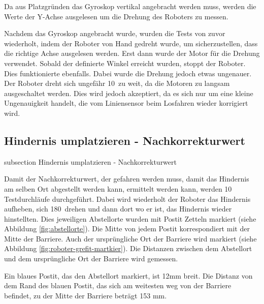 Da aus Platzgründen das Gyroskop vertikal angebracht werden muss, werden die Werte der Y-Achse ausgelesen um die Drehung des Roboters zu messen.

Nachdem das Gyroskop angebracht wurde, wurden die Tests von zuvor wiederholt, indem der Roboter von Hand gedreht wurde, um sicherzustellen, dass die richtige Achse ausgelesen werden. Erst dann wurde der Motor für die Drehung verwendet. Sobald der definierte Winkel erreicht wurden, stoppt der Roboter. Dies funktionierte ebenfalls. Dabei wurde die Drehung jedoch etwas ungenauer. Der Roboter dreht sich ungefähr 10\textdegree \ zu weit, da die Motoren zu langsam ausgeschaltet werden. Dies wird jedoch akzeptiert, da es sich nur um eine kleine Ungenauigkeit handelt, die vom Liniensensor beim Losfahren wieder korrigiert wird.


\newpage
\subsection*{Hindernis umplatzieren - Nachkorrekturwert}\label{hindernis-nachkorrektur}
    {subsection}
    {Hindernis umplatzieren - Nachkorrekturwert}

Damit der Nachkorrekturwert, der gefahren werden muss, damit das Hindernis am selben Ort abgestellt werden kann, ermittelt werden kann, werden 10 Testdurchläufe durchgeführt. Dabei wird wiederholt der Roboter das Hindernis aufheben, sich 180\textdegree \ drehen und dann dort wo er ist, das Hindernis wieder hinstellten. Dies jeweiligen Abstellorte wurden mit Postit Zetteln markiert (siehe Abbildung \ref{fig:abstellorte}). Die Mitte von jedem Postit korrespondiert mit der Mitte der Barriere. Auch der ursprüngliche Ort der Barriere wird markiert (siehe Abbildung \ref{fig:roboter-grefit-martkier}). Die Distanzen zwischen dem Abstellort und dem ursprüngliche Ort der Barriere wird gemessen. 

Ein blaues Postit, das den Abstellort markiert, ist 12mm breit. Die Distanz von dem Rand des blauen Postit, das sich am weitesten weg von der Barriere befindet, zu der Mitte der Barriere beträgt 153 mm.

